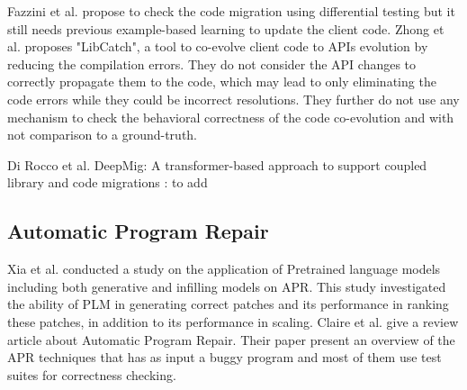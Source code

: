  Fazzini et al. \cite{10.1145/3387905.3388608} propose to check the code migration using differential testing but it still needs previous example-based learning to update the client code.
 Zhong et al. \cite{10.1145/3597503.3639084} proposes "LibCatch", a tool to co-evolve client code to APIs evolution by reducing the compilation errors. They do not consider the API changes to correctly propagate them to the code, which may lead to only eliminating the code errors while they could be incorrect resolutions. They further do not use any mechanism to check the behavioral correctness of the code co-evolution and with not comparison to a ground-truth.
 
Di Rocco et al.  \cite{DIROCCO2025107588} DeepMig: A transformer-based approach to support coupled library and code migrations : to add 
 
 
 
 
 
 
 \subsection{Automatic Program Repair}
 \label{APR}
 
 
Xia et al. \cite{10.1109/ICSE48619.2023.00129} conducted a study on the application of Pretrained language models including both generative and infilling models on APR. This study investigated the ability of PLM in generating correct patches and its performance in ranking these patches, in addition to its performance in scaling.
Claire et al. \cite{goues2019automated} give a review article about Automatic Program Repair. Their paper present an overview of the APR techniques that has as input a buggy program and most of them use test suites for correctness checking.
 
